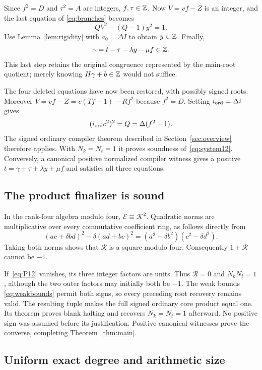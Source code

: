 Since $f^2=D$ and $\tau^2=A$ are integers, $f,\tau\in\mathbb Z$.
Now $V=vf-Z$ is an integer, and the last equation of
\eqref{eq:branches} becomes
\[
QV^2-(Q-1)y^2=1.
\]
Use Lemma~\ref{lem:rigidity} with $a_0=\Delta I$ to obtain
$y\in\mathbb Z$.  Finally,
\[
\gamma=t-\tau-\lambda y-\mu f\in\mathbb Z.
\]
This last step retains the original congruence represented by the
main-root quotient; merely knowing $H\gamma+b\in\mathbb Z$ would not suffice.

The four deleted equations have now been restored, with possibly signed
roots.  Moreover $V=vf-Z=c(Tf-1)-Rf^2$ because $f^2=D$.
Setting $i_{\rm ord}=\Delta i$ gives
\[
(i_{\rm ord}c^2)^2=Q=\Delta(f^2-1).
\]
The signed ordinary compiler theorem described in
Section~\ref{sec:overview} therefore applies.  With $N_k=N_t=1$ it
proves soundness of~\eqref{eq:system12}.  Conversely, a canonical
positive normalized compiler witness gives a positive
$t=\gamma+\tau+\lambda y+\mu f$ and satisfies all three equations.

\subsection{The product finalizer is sound}

In the rank-four algebra modulo four, $\mathcal E\equiv\mathcal K^2$.
Quadratic norms are multiplicative over every commutative coefficient
ring, as follows directly from
\[
(ac+\delta bd)^2-\delta(ad+bc)^2
=(a^2-\delta b^2)(c^2-\delta d^2).
\]
Taking both norms shows that $\mathcal R$ is a square modulo four.
Consequently $1+\mathcal R$ cannot be $-1$.

If~\eqref{eq:P12} vanishes, its three integer factors are units.
Thus $\mathcal R=0$ and $N_kN_t=1$, although the two outer factors
may initially both be $-1$.  The weak bounds
\eqref{eq:weakbounds} permit both signs, so every preceding root
recovery remains valid.  The resulting tuple makes the full signed
ordinary core product equal one.  Its theorem proves blank halting
and recovers $N_k=N_t=1$ afterward.  No positive sign was assumed
before its justification.  Positive canonical witnesses prove the
converse, completing Theorem~\ref{thm:main}.

\subsection{Uniform exact degree and arithmetic size}

